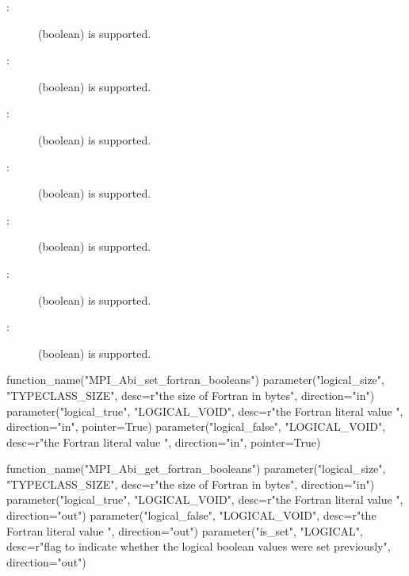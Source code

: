 \begin{description}
\item[:]     (boolean)  is supported.
\item[:]    (boolean)  is supported.
\item[:]  (boolean)  is supported.
\item[:]  (boolean)  is supported.
\item[:] (boolean)  is supported.
\item[:] (boolean)  is supported.
\item[:] (boolean)  is supported.
\end{description}

\begin{mpi-binding}
    function_name("MPI_Abi_set_fortran_booleans")
    parameter("logical_size", "TYPECLASS_SIZE",
              desc=r"the size of Fortran  in bytes",
              direction="in")
    parameter("logical_true", "LOGICAL_VOID",
              desc=r"the Fortran literal value ",
              direction="in", pointer=True)
    parameter("logical_false", "LOGICAL_VOID",
              desc=r"the Fortran literal value ",
              direction="in", pointer=True)
\end{mpi-binding}

\begin{mpi-binding}
    function_name("MPI_Abi_get_fortran_booleans")
    parameter("logical_size", "TYPECLASS_SIZE",
              desc=r"the size of Fortran  in bytes",
              direction="in")
    parameter("logical_true", "LOGICAL_VOID",
              desc=r"the Fortran literal value ",
              direction="out")
    parameter("logical_false", "LOGICAL_VOID",
              desc=r"the Fortran literal value ",
              direction="out")
    parameter("is_set", "LOGICAL",
              desc=r"flag to indicate whether the logical boolean values were set previously",
              direction="out")
\end{mpi-binding}

